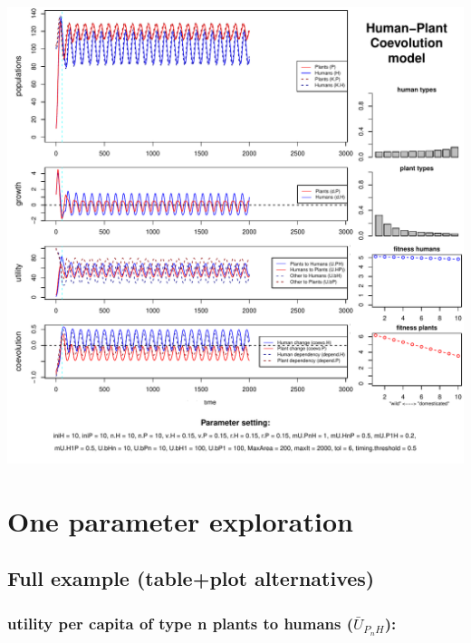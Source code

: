 \documentclass[]{book}
\begin{document}
\includegraphics{hpcModel-exploration_files/figure-latex/1_run.semicoevo.osc2-plot-1.pdf}

\hypertarget{one-parameter-exploration}{%
\chapter{One parameter exploration}\label{one-parameter-exploration}}

\newpage

\hypertarget{full-example-tableplot-alternatives}{%
\section{Full example (table+plot alternatives)}\label{full-example-tableplot-alternatives}}

\hypertarget{utility-per-capita-of-type-n-plants-to-humans-baru_p_nh}{%
\subsection{\texorpdfstring{utility per capita \textbf{of} type n plants \textbf{to} humans (\(\bar{U}_{P_{n}H}\)):}{utility per capita of type n plants to humans (\textbackslash{}bar\{U\}\_\{P\_\{n\}H\}):}}\label{utility-per-capita-of-type-n-plants-to-humans-baru_p_nh}}
\end{document}
